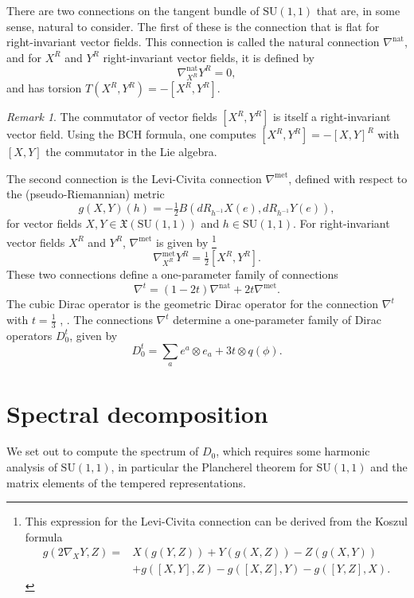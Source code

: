 \documentclass{amsart}
\theoremstyle{definition}
\theoremstyle{remark}
\newtheorem{remark}[theorem]{Remark}
\numberwithin{equation}{section}
\begin{document}
There are two connections on the tangent bundle of $\mathrm{SU}(1,1)$ that are, in some sense, natural to consider. The first of these is the connection that is flat for right-invariant vector fields. This connection is called the natural connection $\nabla^\mathrm{nat}$, and for $X^R$ and $Y^R$ right-invariant vector fields, it is defined by
\begin{equation*}
    \nabla^\mathrm{nat}_{X^R}Y^R=0,
\end{equation*}
and has torsion $T(X^R,Y^R)=-[X^R,Y^R]$.
\begin{remark}
    The commutator of vector fields $[X^R,Y^R]$ is itself a right-invariant vector field. Using the BCH formula, one computes $[X^R,Y^R]=-[X,Y]^R$ with $[X,Y]$ the commutator in the Lie algebra. 
\end{remark}
The second connection is the Levi-Civita connection $\nabla^\mathrm{met}$, defined with respect to the (pseudo-Riemannian) metric
\begin{equation*}
    g(X,Y)(h)=-\tfrac{1}{2}B(dR_{h^{-1}}X(e),dR_{h^{-1}}Y(e)),
\end{equation*} 
for vector fields $X,Y\in\mathfrak{X}(\mathrm{SU}(1,1))$ and $h\in\mathrm{SU}(1,1)$. For right-invariant vector fields $X^R$ and $Y^R$, $\nabla^\mathrm{met}$ is given by \footnote{This expression for the Levi-Civita connection can be derived from the Koszul formula
\begin{align*}
    g(2\nabla_XY,Z)=&X(g(Y,Z))+Y(g(X,Z))-Z(g(X,Y))\\
    &+g([X,Y],Z)-g([X,Z],Y)-g([Y,Z],X).
\end{align*}}
\begin{equation*}
    \nabla^\mathrm{met}_{X^R}Y^R=\tfrac{1}{2}[X^R,Y^R].
\end{equation*}
These two connections define a one-parameter family of connections
\begin{equation*}
    \nabla^t=(1-2t)\nabla^\mathrm{nat}+2t\nabla^\mathrm{met}.
\end{equation*}
The cubic Dirac operator is the geometric Dirac operator for the connection $\nabla^t$ with $t=\tfrac{1}{3}$ \cite{agricola_2003}, \cite[Theorem 9.1]{meinrenken_2013}. The connections $\nabla^t$ determine a one-parameter family of Dirac operators $D_0^t$, given by
\begin{equation}\label{dirac_one_parameter}
    D_0^t=\sum_a e^a\otimes e_a +3t\otimes q(\phi).
\end{equation}

\section{Spectral decomposition}\label{sec_harmonic_analysis}
We set out to compute the spectrum of $D_0$, which requires some harmonic analysis of $\mathrm{SU}(1,1)$, in particular the Plancherel theorem for $\mathrm{SU}(1,1)$ and the matrix elements of the tempered representations. 
\end{document}
